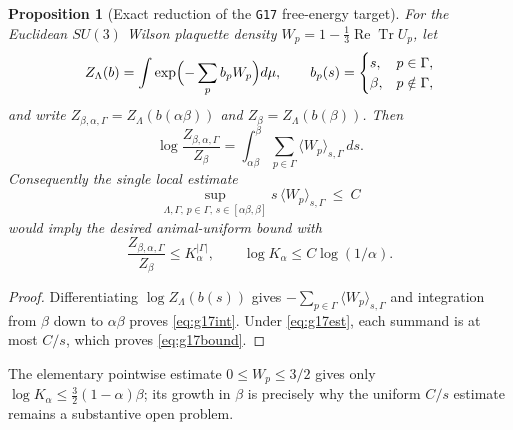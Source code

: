 \documentclass[11pt]{article}
\theoremstyle{plain}
\newtheorem{proposition}[theorem]{Proposition}
\theoremstyle{definition}
\theoremstyle{remark}
\begin{document}
\begin{proposition}[Exact reduction of the \texttt{G17} free-energy target]\label{prop:g17}
For the Euclidean $SU(3)$ Wilson plaquette density
$W_p=1-\tfrac13\operatorname{Re}\operatorname{Tr}U_p$, let
\[
  Z_\Lambda(b)=\int\exp\Bigl(-\sum_p b_pW_p\Bigr)d\mu,
  \qquad
  b_p(s)=\begin{cases}s,&p\in\Gamma,\\ \beta,&p\notin\Gamma,\end{cases}
\]
and write $Z_{\beta,\alpha,\Gamma}=Z_\Lambda(b(\alpha\beta))$ and
$Z_\beta=Z_\Lambda(b(\beta))$. Then
\begin{equation}\label{eq:g17int}
  \log\frac{Z_{\beta,\alpha,\Gamma}}{Z_\beta}
  =\int_{\alpha\beta}^{\beta}\sum_{p\in\Gamma}\langle W_p\rangle_{s,\Gamma}\,ds .
\end{equation}
Consequently the single local estimate
\begin{equation}\label{eq:g17est}
  \sup_{\Lambda,\Gamma,\,p\in\Gamma,\,s\in[\alpha\beta,\beta]}
  s\,\langle W_p\rangle_{s,\Gamma}\ \le\ C
\end{equation}
would imply the desired animal-uniform bound with
\begin{equation}\label{eq:g17bound}
  \frac{Z_{\beta,\alpha,\Gamma}}{Z_\beta}\le K_\alpha^{|\Gamma|},
  \qquad \log K_\alpha\le C\log(1/\alpha).
\end{equation}
\end{proposition}

\begin{proof}
Differentiating $\log Z_\Lambda(b(s))$ gives
$-\sum_{p\in\Gamma}\langle W_p\rangle_{s,\Gamma}$ and integration from $\beta$
down to $\alpha\beta$ proves \eqref{eq:g17int}. Under \eqref{eq:g17est}, each
summand is at most $C/s$, which proves \eqref{eq:g17bound}.
\end{proof}

\noindent The elementary pointwise estimate $0\le W_p\le3/2$ gives only
$\log K_\alpha\le\tfrac32(1-\alpha)\beta$; its growth in $\beta$ is precisely
why the uniform $C/s$ estimate remains a substantive open problem.
\end{document}
